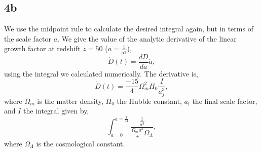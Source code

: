\subsection{4b}



We use the midpoint rule to calculate the desired integral again, but in terms
of the scale factor $a$. We give the value of the analytic derivative of the
linear growth factor at redshift $z=50$ ($a = \frac{1}{51}$),
\begin{equation}
 \dot D(t) = \frac{dD}{da}\dot a,
\end{equation}
using the integral we calculated numerically. The derivative is,
\begin{equation}
 \dot D(t) = \frac{-15}{4}\Omega_m^2 H_0 \frac{I}{a_f^3},
\end{equation}
where $\Omega_m$ is the matter density, $H_0$ the Hubble constant,
$a_{\textrm{f}}$ the final scale factor, and $I$ the integral given by,
\begin{equation}
 \int_{a=0}^{a=\frac{1}{51}} \frac{\frac{1}{a^3}}
        {\frac{\Omega_{\textrm{m}}{a^3}} + \Omega_{\Lambda}},
\end{equation}
where $\Omega_{\Lambda}$ is the cosmological constant.
